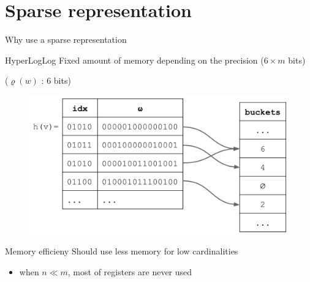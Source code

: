 \documentclass{beamer}
\begin{document}
\section{Sparse representation}
\begin{frame}{Why use a sparse representation}

  \begin{alertblock}{HyperLogLog}
    Fixed amount of memory depending on the precision ($6\times m$ bits)

    ($\varrho(w)$ : 6 bits)
  \end{alertblock}

  \begin{figure}[c]
    \includegraphics [scale=0.33]  {hyperloglog_buckets.png}
  \end{figure}


  \begin{block}{Memory efficieny}
    Should use less memory for low cardinalities
    \begin{itemize}
      \item when $n \ll m$, most of registers are never used 
    \end{itemize}
  \end{block}

\end{frame}
\end{document}
